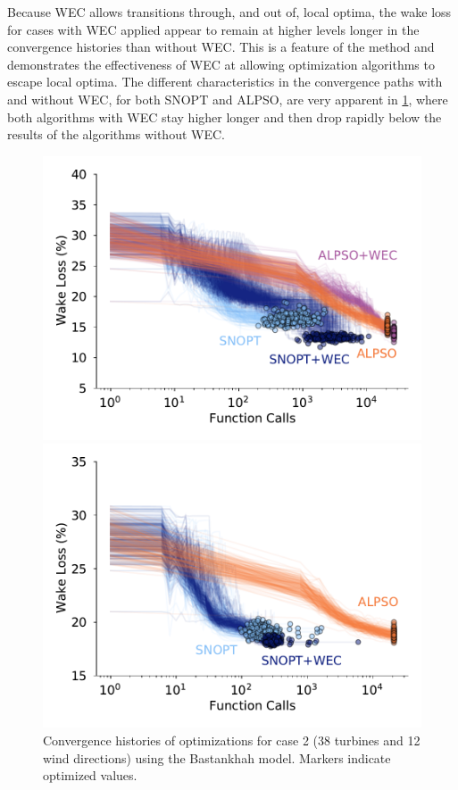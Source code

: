 \documentclass[journal abbreviation, manuscript]{copernicus}
\begin{document}
	Because WEC allows transitions through, and out of, local optima, the wake loss for cases with WEC applied appear to remain at higher levels longer in the convergence histories than without WEC. This is a feature of the method and demonstrates the effectiveness of WEC at allowing optimization algorithms to escape local optima. The different characteristics in the convergence paths with and without WEC, for both SNOPT and ALPSO, are very apparent in \ref{fig:case-2-histories}, where both algorithms with WEC stay higher longer and then drop rapidly below the results of the algorithms without WEC.
	
	\begin{figure}[h!]
		\centering
		\begin{minipage}[t]{.45\textwidth}
			\centering
			\includegraphics[width=\textwidth]{final_images/results/convergence_history_BPAmodel_38turbs_12dirs}  
			\caption{Convergence histories of optimizations for case 2 (38 turbines and 12 wind directions) using the Bastankhah model. Markers indicate optimized values.}
			\label{fig:case-2-histories}
		\end{minipage}\hspace{1pc}
		\begin{minipage}[t]{0.45\textwidth}
			\centering
			\includegraphics[width=\textwidth]{final_images/results/convergence_history_JENSENmodel_38turbs_12dirs}  

\end{minipage}
\end{figure}
\end{document}
